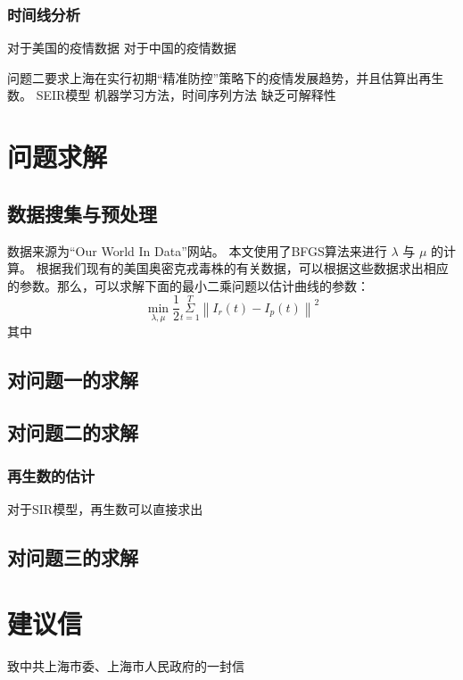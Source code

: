 \documentclass[bwprint]{gmcmthesis}
\numberwithin{figure}{section}
\begin{document}
\subsubsection{时间线分析}

对于美国的疫情数据
对于中国的疫情数据



问题二要求上海在实行初期“精准防控”策略下的疫情发展趋势，并且估算出再生数。
SEIR模型
机器学习方法，时间序列方法
缺乏可解释性

\section{问题求解}
\subsection{数据搜集与预处理}
数据来源为“Our World In Data”网站。
本文使用了BFGS算法来进行 $\lambda$ 与 $\mu$ 的计算。
根据我们现有的美国奥密克戎毒株的有关数据，可以根据这些数据求出相应的参数。那么，可以求解下面的最小二乘问题以估计曲线的参数：
\begin{equation} \label{}
    \underset{\lambda ,\mu}{\min}\frac{1}{2}\underset{t=1}{\overset{T}{\varSigma}}\left\| I_r\left( t \right) -I_p\left( t \right) \right\| ^2
\end{equation}
其中
\subsection{对问题一的求解}
\subsection{对问题二的求解}
\subsubsection{再生数的估计}
对于SIR模型，再生数可以直接求出
\subsection{对问题三的求解}

\section{建议信}
致中共上海市委、上海市人民政府的一封信
\end{document}
